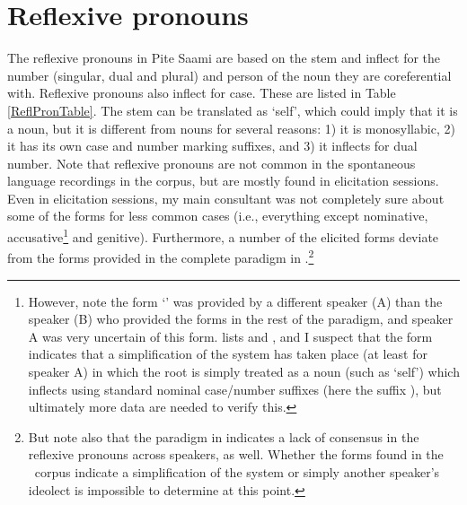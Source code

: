 \FB



\section{Reflexive pronouns}\label{reflexivePronouns}
The reflexive pronouns in Pite Saami are based on the stem  and inflect for the number (singular, dual and plural) and person of the noun they are coreferential with. Reflexive pronouns also inflect for case. These are listed in Table \vref{ReflPronTable}. 
The stem  can be translated as ‘self’, which could imply that it is a noun, but it is different from nouns for several reasons: 1) it is monosyllabic, 2) it has its own case and number marking suffixes, and 3) it inflects for dual number. %
Note that reflexive pronouns are not common in the spontaneous language recordings in the corpus, but are mostly found in elicitation sessions. Even in elicitation sessions, my main consultant was not completely sure about some of the forms for less common cases (i.e., everything except nominative, accusative\footnote{However, note the form  ‘’ was provided by a different speaker (A) than the speaker (B) who provided the forms in the rest of the paradigm, and speaker A was very uncertain of this form. \citet[162]{Lehtiranta1992} lists  and , and I suspect that the form  indicates that a simplification of the system has taken place (at least for speaker A) in which the root  is simply treated as a noun (such as ‘self’) which inflects using standard nominal case/number suffixes (here the  suffix ), but ultimately more data are needed to verify this.} 
and genitive). Furthermore, a number of the elicited forms deviate from the forms provided in the complete paradigm in \citet[162]{Lehtiranta1992}.\footnote{But note also that the paradigm in \citet[162]{Lehtiranta1992} indicates a lack of consensus in the reflexive pronouns across speakers, as well. Whether the forms found in the \PSDP\ corpus indicate a simplification of the system or simply another speaker’s ideolect is impossible to determine at this point.}

